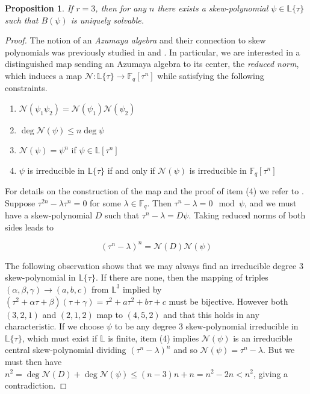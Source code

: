 \documentclass[sigconf]{acmart}
\newtheorem{prop}{Proposition}
\newcommand{\F}{\mathbb{F}}
\renewcommand{\L}{\mathbb{L}}
\newcommand{\cN}{\mathcal{N}}
\newcommand{\sring}{\L\{\tau\}}
\newcommand{\comm}{\mathbb{F}_q[\tau^n]}
\begin{document}
\begin{prop}\label{rank3}
If $r = 3$, then for any $n$ there exists a skew-polynomial $\psi \in \L\{\tau\}$ such that $B(\psi)$ is uniquely solvable.
\end{prop}
\begin{proof}
The notion of an \textit{Azumaya algebra} and their connection to skew polynomials was previously studied in \cite{Ikehata1984AzumayaAA} and \cite{skewfactor}. In particular, we are interested in a distinguished map sending an Azumaya algebra to its center, the \textit{reduced norm}, which induces a map $\cN: \L\{\tau\} \to \comm$ while satisfying the following constraints.

\begin{enumerate}
    \item $\cN(\psi_1 \psi_2) = \cN(\psi_1) \cN(\psi_2)$
    \item $\deg \cN(\psi) \leq n \deg \psi$
    \item $\cN(\psi) = \psi^n$ if $\psi \in \L[\tau^n]$
    \item $\psi$ is irreducible in $\sring$ if and only if $\cN(\psi)$ is irreducible in $\F_q[\tau^n]$
\end{enumerate}

For details on the construction of the map and the proof of item (4) we refer to \cite{skewfactor}. Suppose $\tau^{2n} - \lambda \tau^n = 0$ for some $\lambda \in \F_q$. Then $\tau^{n} - \lambda = 0 \mod \psi$, and we must have a skew-polynomial $D$ such that $\tau^n - \lambda = D \psi$. Taking reduced norms of both sides leads to

\begin{equation*}
(\tau^n - \lambda)^n = \cN(D)\cN(\psi)
\end{equation*}

The following observation shows that we may always find an irreducible degree 3 skew-polynomial in $\L\{\tau\}$. If there are none, then the mapping of triples $(\alpha, \beta, \gamma) \to (a, b, c)$ from $\L^3$ implied by $(\tau^2 + \alpha \tau + \beta)(\tau + \gamma) = \tau^2 + a \tau^2 + b\tau + c$ must be bijective. However both $(3, 2, 1)$ and $(2, 1, 2)$ map to $(4, 5, 2)$ and that this holds in any characteristic.  If we choose $\psi$ to be any degree 3 skew-polynomial irreducible in $\L\{\tau \}$, which must exist if $\L$ is finite, item (4) implies $\cN(\psi)$ is an irreducible central skew-polynomial dividing $(\tau^n - \lambda)^n$ and so $\cN(\psi) = \tau^n - \lambda$. But we must then have $n^2 = \deg \cN(D) + \deg \cN(\psi) \leq (n-3)n + n = n^2 - 2n < n^2$, giving a contradiction.

\end{proof}
\end{document}
